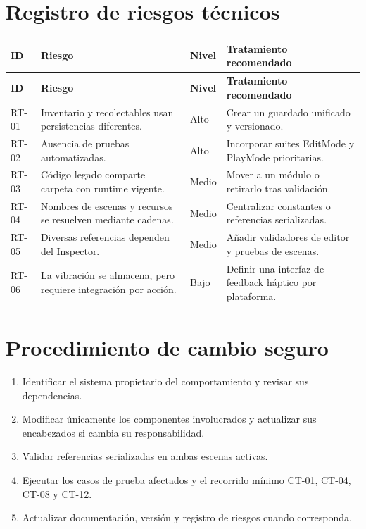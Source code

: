 \documentclass[11pt,a4paper,oneside]{report}
\newcommand{\code}[1]{\texttt{\detokenize{#1}}}
\begin{document}
\section{Registro de riesgos técnicos}

\begin{longtable}{L{0.10\textwidth} L{0.30\textwidth} C{0.13\textwidth} L{0.32\textwidth}}
  \toprule
  \color{white}\textbf{ID} & \color{white}\textbf{Riesgo} & \color{white}\textbf{Nivel} & \color{white}\textbf{Tratamiento recomendado} \\
  \midrule
  \endfirsthead
  \toprule
  \color{white}\textbf{ID} & \color{white}\textbf{Riesgo} & \color{white}\textbf{Nivel} & \color{white}\textbf{Tratamiento recomendado} \\
  \midrule
  \endhead
  RT-01 & Inventario y recolectables usan persistencias diferentes. & Alto & Crear un guardado unificado y versionado. \\
  RT-02 & Ausencia de pruebas automatizadas. & Alto & Incorporar suites EditMode y PlayMode prioritarias. \\
  RT-03 & Código legado comparte carpeta con runtime vigente. & Medio & Mover a un módulo \code{Legacy} o retirarlo tras validación. \\
  RT-04 & Nombres de escenas y recursos se resuelven mediante cadenas. & Medio & Centralizar constantes o referencias serializadas. \\
  RT-05 & Diversas referencias dependen del Inspector. & Medio & Añadir validadores de editor y pruebas de escenas. \\
  RT-06 & La vibración se almacena, pero requiere integración por acción. & Bajo & Definir una interfaz de feedback háptico por plataforma. \\
  \bottomrule
\end{longtable}

\section{Procedimiento de cambio seguro}

\begin{enumerate}
  \item Identificar el sistema propietario del comportamiento y revisar sus dependencias.
  \item Modificar únicamente los componentes involucrados y actualizar sus encabezados si cambia su responsabilidad.
  \item Validar referencias serializadas en ambas escenas activas.
  \item Ejecutar los casos de prueba afectados y el recorrido mínimo CT-01, CT-04, CT-08 y CT-12.
  \item Actualizar documentación, versión y registro de riesgos cuando corresponda.
\end{enumerate}
\end{document}
